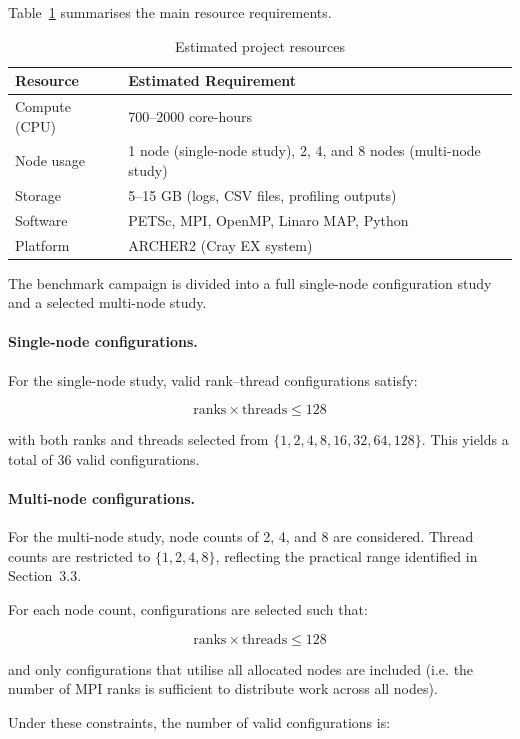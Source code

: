 \documentclass{article}
\begin{document}
Table~\ref{tab:resources} summarises the main resource requirements.

\begin{table}[H]
\centering
\begin{tabular}{|l|l|}
\hline
\textbf{Resource} & \textbf{Estimated Requirement} \\
\hline
Compute (CPU) & 700--2000 core-hours \\
\hline
Node usage & 1 node (single-node study), 2, 4, and 8 nodes (multi-node study) \\
\hline
Storage & 5--15 GB (logs, CSV files, profiling outputs) \\
\hline
Software & PETSc, MPI, OpenMP, Linaro MAP, Python \\
\hline
Platform & ARCHER2 (Cray EX system) \\
\hline
\end{tabular}
\caption{Estimated project resources}
\label{tab:resources}
\end{table}

The benchmark campaign is divided into a full single-node configuration study and a selected multi-node study.

\paragraph{Single-node configurations.}
For the single-node study, valid rank--thread configurations satisfy:

\[
\text{ranks} \times \text{threads} \le 128
\]

with both ranks and threads selected from \(\{1,2,4,8,16,32,64,128\}\). 
This yields a total of 36 valid configurations.

\paragraph{Multi-node configurations.}
For the multi-node study, node counts of 2, 4, and 8 are considered. 
Thread counts are restricted to \(\{1,2,4,8\}\), reflecting the practical range identified in Section~3.3.

For each node count, configurations are selected such that:

\[
\text{ranks} \times \text{threads} \le 128
\]

and only configurations that utilise all allocated nodes are included (i.e. the number of MPI ranks is sufficient to distribute work across all nodes).

Under these constraints, the number of valid configurations is:
\end{document}
